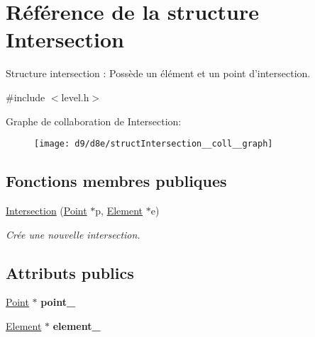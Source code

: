 \hypertarget{structIntersection}{\section{Référence de la structure Intersection}
\label{structIntersection}
}


Structure intersection \+: Possède un élément et un point d'intersection.  




{\ttfamily \#include $<$level.\+h$>$}



Graphe de collaboration de Intersection\+:\nopagebreak
\begin{figure}[H]
\begin{center}
\leavevmode
\texttt{[image: d9/d8e/structIntersection\_\_coll\_\_graph]}
\end{center}
\end{figure}
\subsection*{Fonctions membres publiques}
\begin{DoxyCompactItemize}
\item 
\hyperlink{structIntersection_a44d7ebd733fe15894a44f14a63c3d328}{Intersection} (\hyperlink{classPoint}{Point} $\ast$p, \hyperlink{classElement}{Element} $\ast$e)
\begin{DoxyCompactList}\small\item\em Crée une nouvelle intersection. \end{DoxyCompactList}\end{DoxyCompactItemize}
\subsection*{Attributs publics}
\begin{DoxyCompactItemize}
\item 
\hypertarget{structIntersection_ac914f236feced83128e4f542d21327b2}{\hyperlink{classPoint}{Point} $\ast$ {\bfseries point\+\_\+}}\label{structIntersection_ac914f236feced83128e4f542d21327b2}

\item 
\hypertarget{structIntersection_aae28864f0cb6a95503384a73c33ad4cd}{\hyperlink{classElement}{Element} $\ast$ {\bfseries element\+\_\+}}\label{structIntersection_aae28864f0cb6a95503384a73c33ad4cd}

\end{DoxyCompactItemize}


